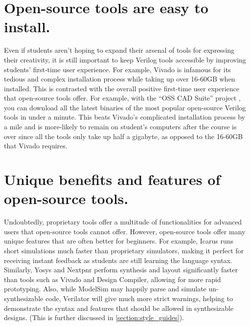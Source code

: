 \section{Open-source tools are easy to install.}

Even if students aren't hoping to expand their arsenal of tools for expressing their creativity, it is still important to keep Verilog tools accessible by improving students' first-time user experience. For example, Vivado is infamous for its tedious and complex installation process while taking up over 16-60GB when installed. This is contrasted with the overall positive first-time user experience that open-source tools offer. For example, with the \enquote{OSS CAD Suite} project \cite{osscadsuitebuildGitHub}, you can download all the latest binaries of the most popular open-source Verilog tools in under a minute. This beats Vivado's complicated installation process by a mile and is more-likely to remain on student's computers after the course is over since all the tools only take up half a gigabyte, as opposed to the 16-60GB that Vivado requires.

\section{Unique benefits and features of open-source tools.}

Undoubtedly, proprietary tools offer a multitude of functionalities for advanced users that open-source tools cannot offer. However, open-source tools offer many unique features that are often better for beginners. For example, Icarus runs short simulations much faster than proprietary simulators, making it perfect for receiving instant feedback as students are still learning the language syntax. Similarly, Yosys and Nextpnr perform synthesis and layout significantly faster than tools such as Vivado and Design Compiler, allowing for more rapid prototyping. Also, while ModelSim may happily parse and simulate un-synthesizable code, Verilator will give much more strict warnings, helping to demonstrate the syntax and features that should be allowed in synthesizable designs. (This is further discussed in \autoref{section:style_guides}).

